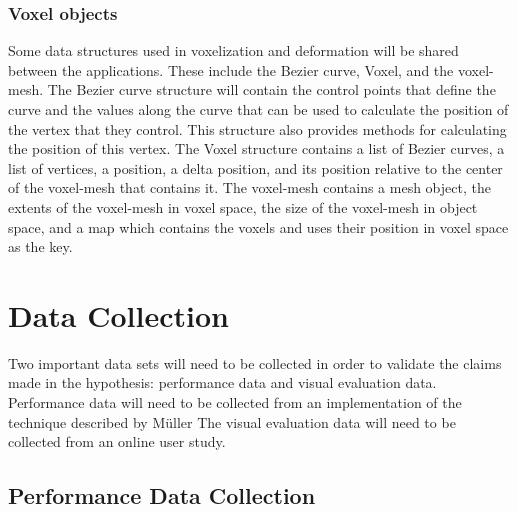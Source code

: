 \subsubsection{Voxel objects} \label{VoxelObjects}

Some data structures used in voxelization and deformation will be shared between the applications.
These include the Bezier curve, Voxel, and the voxel-mesh. The Bezier curve structure will contain
the control points that define the curve and the values along the curve that can be used to 
calculate the position of the vertex that they control. This structure also provides methods for
calculating the position of this vertex. The Voxel structure contains a list of Bezier curves, a 
list of vertices, a position, a delta position, and its position relative to the center of the 
voxel-mesh that contains it. The voxel-mesh contains a mesh object, the extents of the voxel-mesh 
in voxel space, the size of the voxel-mesh in object space, and a map which contains the voxels and
uses their position in voxel space as the key.



\section{Data Collection}

Two important data sets will need to be collected in order to validate the claims made in the 
hypothesis: performance data and visual evaluation data. Performance data will need to be collected
from an implementation of the technique described by Müller \etal The visual evaluation data will
need to be collected from an online user study.

\subsection{Performance Data Collection}

